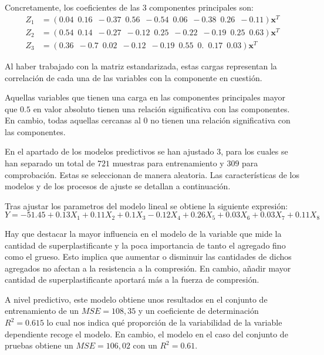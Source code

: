 \noindent Concretamente, los coeficientes de las 3 componentes principales son:
\begin{align}
Z_1&=(0.04 \enspace 0.16  \enspace  -0.37  \enspace 0.56  \enspace   -0.54  \enspace  0.06 \enspace  -0.38  \enspace 0.26  \enspace -0.11)\mathbf{x}^T\\
Z_2&=(0.54 \enspace 0.14 \enspace  -0.27  \enspace -0.12 \enspace   0.25  \enspace -0.22 \enspace  -0.19 \enspace  0.25  \enspace  0.63)\mathbf{x}^T\\
Z_3&=(0.36 \enspace -0.7 \enspace  0.02 \enspace-0.12\enspace -0.19  \enspace 0.55 \enspace 0. \enspace   0.17 \enspace 0.03)\mathbf{x}^T
\end{align}

\noindent Al haber trabajado con la matriz estandarizada, estas cargas representan la correlación de cada una de las variables con la componente en cuestión. 

\noindent Aquellas variables que tienen una carga en las componentes principales mayor que $0.5$ en valor absoluto tienen una relación significativa con las componentes. En cambio, todas aquellas cercanas al $0$ no tienen una relación significativa con las componentes. 

\noindent En el apartado de los modelos predictivos se han ajustado 3, para los cuales se han separado un total de $721$ muestras para entrenamiento y $309$ para comprobación. Estas se seleccionan de manera aleatoria.
\noindent Las características de los modelos y de los procesos de ajuste se detallan a continuación. 

\noindent Tras ajustar los parametros del modelo lineal se obtiene la siguiente expresión:
{\footnotesize
 \begin{equation}
Y=-51.45+0.13 X_1+0.11X_2+0.1X_3-0.12X_4+0.26X_5+  0.03X_6+0.03X_7+0.11X_8
\end{equation}}

\noindent Hay que destacar la mayor influencia en el modelo de la variable que mide la cantidad de superplastificante y la poca importancia de tanto el agregado fino como el grueso. Esto implica que aumentar o disminuir las cantidades de dichos agregados no afectan a la resistencia a la compresión. En cambio, añadir mayor cantidad de superplastificante aportará más a la fuerza de compresión.
  
\noindent A nivel predictivo, este modelo obtiene unos resultados en el conjunto de entrenamiento de un $MSE=108,35$ y un coeficiente de determinación $R^2=0.615$ lo cual nos indica qué proporción de la variabilidad de la variable dependiente recoge el modelo. En cambio, el modelo en el caso del conjunto de pruebas obtiene un $MSE=106,02$ con un $R^2=0.61$. 

